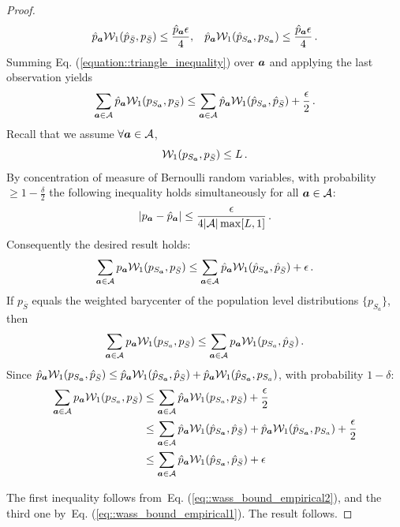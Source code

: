 \documentclass[letterpaper]{article}
\renewcommand{\eqref}[1]{Eq. (\ref{#1})}
\theoremstyle{definition}
\newcommand{\W}{\mathcal{W}}
\newcommand{\bS}{\bar{S}}
\begin{document}
\begin{proof}
\begin{equation}\label{eq::wass_bound_empirical1}
\hat{p}_{\va} \W_1(\hat{p}_{\bS}, p_{\bS} )   \leq \frac{\hat{p}_{\va} \epsilon}{4}, \hskip0.3cm
    \hat{p}_{\va} \W_1( \hat{p}_{S_\va},  p_{S_\va}) \leq \frac{\hat{p}_{\va} \epsilon}{4}\,.
\end{equation}
Summing \eqref{equation::triangle_inequality} over ${\bm{a}}$ and applying the last observation yields%
\begin{equation*}
    \sum_{\va \in \mathcal{A}} \hat{p}_{\va}\W_1(p_{S_{\va}}, p_{\bS}) \leq \sum_{\va \in \mathcal{A}} \hat{p}_{\va} \W_1(\hat{p}_{S_{\va}}, \hat{p}_{\bS}) + \frac{\epsilon  }{2}\,.
\end{equation*}
Recall that we assume $\forall {\bm{a}}\in\mathcal{A}$,
\begin{equation*}
    \W_1(p_{S_\va}, p_{\bar{S}}) \leq L\,.
\end{equation*}
By concentration of measure of Bernoulli random variables, with probability $\geq 1-\frac{\delta}{2}$ the following inequality holds simultaneously for all ${\bm{a}} \in\mathcal{A}$: 
\begin{equation}\label{eq::wass_bound_empirical2}
    |p_{\bm{a}} - \hat{p}_{{\bm{a}}}| \leq \frac{\epsilon}{4| \mathcal{A} | \max[L, 1]}\,.
\end{equation}
Consequently the desired result holds:
\begin{equation*}
    \sum_{\va \in \mathcal{A}} p_{\va}\W_1(p_{S_{\va}}, p_{\bS}) \leq \sum_{\va \in \mathcal{A}} \hat{p}_{\va} \W_1(\hat{p}_{S_{\va}}, \hat{p}_{\bS}) + \epsilon\,.
\end{equation*}
If $p_{\bS}$ equals the weighted barycenter of the population level distributions $\{p_{S_a}\}$, then 
\begin{equation*}
\sum_{\va \in \mathcal{A}} p_{\va} \W_1(p_{S_a}, p_{\bS}) \leq \sum_{\va \in \mathcal{A}} p_{\va} \W_1(p_{S_a}, \hat{p}_{\bS})\,.
\end{equation*}
Since $\hat{p}_{\va} \W_1(p_{S_{\va}}, \hat{p}_{\bS}) \leq \hat{p}_{\va} \W_1(\hat{p}_{S_\va}, \hat{p}_{\bS}) + \hat{p}_{\va}\W_1(\hat{p}_{S_{\va}}, p_{S_a})$, with probability $1-\delta$:
\begin{align*}
    \sum_{\va \in \mathcal{A}} p_{\va} \W_1(p_{S_a}, p_{\bS}) &\leq  \sum_{\va \in \mathcal{A}} \hat{p}_{\va} \W_1(p_{S_a}, p_{\bS}) + \frac{\epsilon}{2}  \\
    &\leq \sum_{\va \in \mathcal{A}} \hat{p}_{\va} \W_1(\hat{p}_{S_\va}, \hat{p}_{\bS}) + \hat{p}_{\va}\W_1(\hat{p}_{S_{\va}}, p_{S_a}) + \frac{\epsilon}{2}\\
    &\leq \sum_{\va \in \mathcal{A}} \hat{p}_{\va} \W_1(\hat{p}_{S_\va}, \hat{p}_{\bS}) + \epsilon
\end{align*}

The first inequality follows from~\eqref{eq::wass_bound_empirical2}, and the third one by~\eqref{eq::wass_bound_empirical1}. The result follows.

\end{proof}
\end{document}
